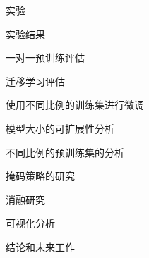 \documentclass[a4paper,12pt]{article}
\begin{document}
\begin{section}{实验}
\begin{subsection}{实验结果}
\begin{subsubsection}{一对一预训练评估}

\end{subsubsection}
\begin{subsubsection}{迁移学习评估}

\end{subsubsection}
\begin{subsubsection}{使用不同比例的训练集进行微调}

\end{subsubsection}
\begin{subsubsection}{模型大小的可扩展性分析}

\end{subsubsection}
\begin{subsubsection}{不同比例的预训练集的分析}

\end{subsubsection}
\begin{subsubsection}{掩码策略的研究}

\end{subsubsection}
\begin{subsubsection}{消融研究}

\end{subsubsection}
\begin{subsubsection}{可视化分析}

\end{subsubsection}

\end{subsection}
\end{section}

\begin{section}{结论和未来工作}

\end{section}
\end{document}
